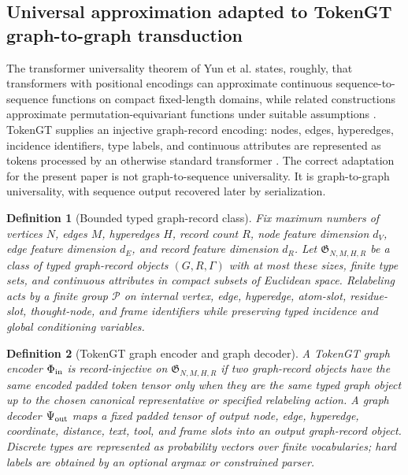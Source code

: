 \documentclass[11pt]{article}
\newtheorem{definition}{Definition}[section]
\newcommand{\1}{\mathbf{1}}
\begin{document}
\subsection{Universal approximation adapted to TokenGT graph-to-graph transduction}

The transformer universality theorem of Yun et al. states, roughly, that transformers with positional encodings can approximate continuous sequence-to-sequence functions on compact fixed-length domains, while related constructions approximate permutation-equivariant functions under suitable assumptions \cite{Yun2020}. TokenGT supplies an injective graph-record encoding: nodes, edges, hyperedges, incidence identifiers, type labels, and continuous attributes are represented as tokens processed by an otherwise standard transformer \cite{KimTokenGT2022}. The correct adaptation for the present paper is not graph-to-sequence universality. It is graph-to-graph universality, with sequence output recovered later by serialization.

\begin{definition}[Bounded typed graph-record class]
Fix maximum numbers of vertices \(N\), edges \(M\), hyperedges \(H\), record count \(R\), node feature dimension \(d_V\), edge feature dimension \(d_E\), and record feature dimension \(d_R\). Let \(\mathfrak G_{N,M,H,R}\) be a class of typed graph-record objects \((G,R,\Gamma)\) with at most these sizes, finite type sets, and continuous attributes in compact subsets of Euclidean space. Relabeling acts by a finite group \(\mathcal P\) on internal vertex, edge, hyperedge, atom-slot, residue-slot, thought-node, and frame identifiers while preserving typed incidence and global conditioning variables.
\end{definition}

\begin{definition}[TokenGT graph encoder and graph decoder]
A TokenGT graph encoder \(\Phi_{\rm in}\) is \emph{record-injective} on \(\mathfrak G_{N,M,H,R}\) if two graph-record objects have the same encoded padded token tensor only when they are the same typed graph object up to the chosen canonical representative or specified relabeling action. A graph decoder \(\Psi_{\rm out}\) maps a fixed padded tensor of output node, edge, hyperedge, coordinate, distance, text, tool, and frame slots into an output graph-record object. Discrete types are represented as probability vectors over finite vocabularies; hard labels are obtained by an optional argmax or constrained parser.
\end{definition}
\end{document}
